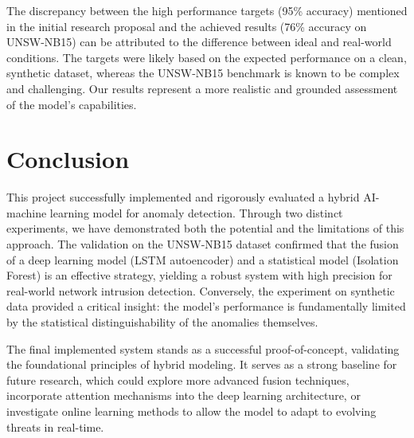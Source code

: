 \documentclass[conference]{IEEEtran}
\begin{document}
The discrepancy between the high performance targets (95\% accuracy) mentioned in the initial research proposal and the achieved results (76\% accuracy on UNSW-NB15) can be attributed to the difference between ideal and real-world conditions. The targets were likely based on the expected performance on a clean, synthetic dataset, whereas the UNSW-NB15 benchmark is known to be complex and challenging. Our results represent a more realistic and grounded assessment of the model's capabilities.

\section{Conclusion}
This project successfully implemented and rigorously evaluated a hybrid AI-machine learning model for anomaly detection. Through two distinct experiments, we have demonstrated both the potential and the limitations of this approach. The validation on the UNSW-NB15 dataset confirmed that the fusion of a deep learning model (LSTM autoencoder) and a statistical model (Isolation Forest) is an effective strategy, yielding a robust system with high precision for real-world network intrusion detection. Conversely, the experiment on synthetic data provided a critical insight: the model's performance is fundamentally limited by the statistical distinguishability of the anomalies themselves.

The final implemented system stands as a successful proof-of-concept, validating the foundational principles of hybrid modeling. It serves as a strong baseline for future research, which could explore more advanced fusion techniques, incorporate attention mechanisms into the deep learning architecture, or investigate online learning methods to allow the model to adapt to evolving threats in real-time.
\end{document}
